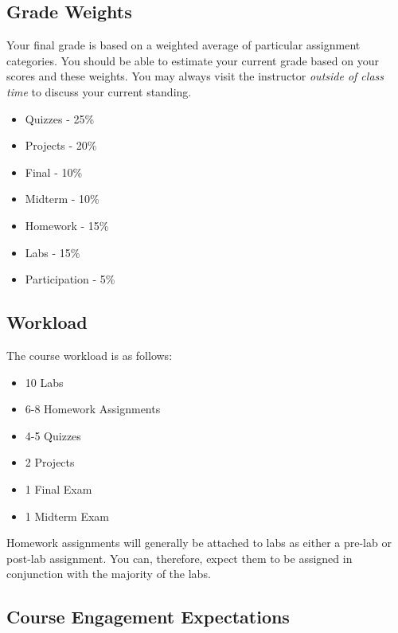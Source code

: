 \documentclass[10pt]{article}
\begin{document}
\subsection{Grade Weights}
Your final grade is based on a weighted average of particular assignment categories.  You should be able to estimate your current grade based on your scores and these weights.  You may always visit the instructor \textit{outside of class time} to discuss your current standing.  
\begin{itemize}
\item Quizzes - 25\%
\item Projects - 20\%
\item Final - 10\%
\item Midterm - 10\%
\item Homework - 15\%
\item Labs - 15\%
\item Participation - 5\%
\end{itemize} 

\subsection{Workload}
The course workload is as follows:
\begin{itemize}
\item 10 Labs
\item 6-8 Homework Assignments
\item 4-5 Quizzes
\item 2 Projects
\item 1 Final Exam
\item 1 Midterm Exam
\end{itemize}

Homework assignments will generally be attached to labs as either a pre-lab or post-lab assignment. You can, therefore, expect them to be assigned in conjunction with the majority of the labs.

\subsection{Course Engagement Expectations}
\end{document}
